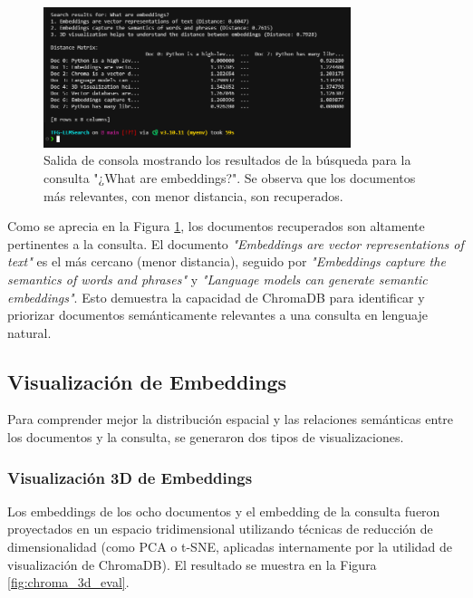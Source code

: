 \begin{figure}[H]
\centering
\includegraphics[width=0.8\textwidth]{archivos/chroma_console.png}
\caption[Resultados de Búsqueda Semántica en Consola con ChromaDB]{Salida de consola mostrando los resultados de la búsqueda para la consulta "¿What are embeddings?". Se observa que los documentos más relevantes, con menor distancia, son recuperados.}
\label{fig:chroma_console_eval}
\end{figure}

Como se aprecia en la Figura \ref{fig:chroma_console_eval}, los documentos recuperados son altamente pertinentes a la consulta. El documento \textit{"Embeddings are vector representations of text"} es el más cercano (menor distancia), seguido por \textit{"Embeddings capture the semantics of words and phrases"} y \textit{"Language models can generate semantic embeddings"}. Esto demuestra la capacidad de ChromaDB para identificar y priorizar documentos semánticamente relevantes a una consulta en lenguaje natural.

\subsection{Visualización de Embeddings}

Para comprender mejor la distribución espacial y las relaciones semánticas entre los documentos y la consulta, se generaron dos tipos de visualizaciones.

\subsubsection{Visualización 3D de Embeddings}
Los embeddings de los ocho documentos y el embedding de la consulta fueron proyectados en un espacio tridimensional utilizando técnicas de reducción de dimensionalidad (como PCA o t-SNE, aplicadas internamente por la utilidad de visualización de ChromaDB). El resultado se muestra en la Figura \ref{fig:chroma_3d_eval}.

